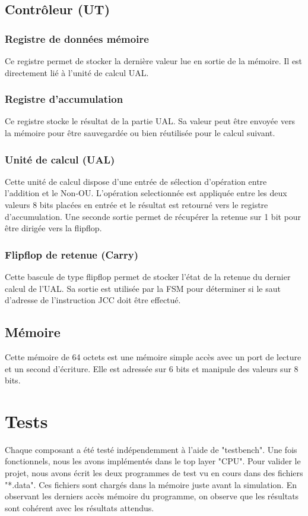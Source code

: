 \documentclass{article}
\begin{document}
    \subsection{Contrôleur (UT)}
    \subsubsection{Registre de données mémoire}
    \par Ce registre permet de stocker la dernière valeur lue en sortie de la mémoire. Il est directement lié à l'unité de calcul UAL.
    \subsubsection{Registre d'accumulation}
    \par Ce registre stocke le résultat de la partie UAL. Sa valeur peut être envoyée vers la mémoire pour être sauvegardée ou bien réutilisée pour le calcul suivant.
    \subsubsection{Unité de calcul (UAL)}
    \par Cette unité de calcul dispose d'une entrée de sélection d'opération entre l'addition et le Non-OU. L'opération selectionnée est appliquée entre les deux valeurs 8 bits placées en entrée et le résultat est retourné vers le registre d'accumulation. Une seconde sortie permet de récupérer la retenue sur 1 bit pour être dirigée vers la flipflop.
    \subsubsection{Flipflop de retenue (Carry)}
    \par Cette bascule de type flipflop permet de stocker l'état de la retenue du dernier calcul de l'UAL. Sa sortie est utilisée par la FSM pour déterminer si le saut d'adresse de l'instruction JCC doit être effectué.
    \subsection{Mémoire}
	\par Cette mémoire de 64 octets est une mémoire simple accès avec un port de lecture et un second d'écriture. Elle est adressée sur 6 bits et manipule des valeurs sur 8 bits.
	
	\section{Tests}
	\par Chaque composant a été testé indépendemment à l'aide de "testbench". Une fois fonctionnels, nous les avons implémentés dans le top layer "CPU". Pour valider le projet, nous avons écrit les deux programmes de test vu en cours dans des fichiers "*.data". Ces fichiers sont chargés dans la mémoire juste avant la simulation. En observant les derniers accès mémoire du programme, on observe que les résultats sont cohérent avec les résultats attendus.
\end{document}

